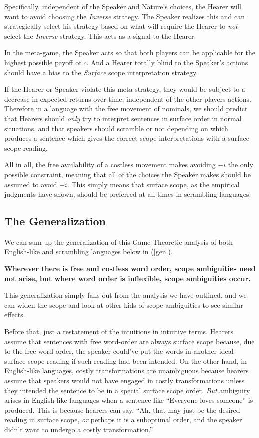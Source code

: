 \documentclass{article}
\begin{document}
Specifically, independent of the Speaker and Nature's choices, the Hearer will want to avoid choosing the \emph{Inverse} strategy.
The Speaker realizes this and can strategically select his strategy based on what will require the Hearer to \emph{not} select the \emph{Inverse} strategy.
This acts as a signal to the Hearer.

In the meta-game, the Speaker acts so that both players can be applicable for the highest possible payoff of $c$.
And a Hearer totally blind to the Speaker's actions should have a bias to the \emph{Surface} scope interpretation strategy.

If the Hearer or Speaker violate this meta-strategy, they would be subject to a decrease in expected returns over time, independent of the other players actions.
Therefore in a language with the free movement of nominals, we should predict that Hearers should \emph{only} try to interpret sentences in surface order in normal situations, and that speakers should scramble or not depending on which produces a sentence which gives the correct scope interpretations with a surface scope reading.

All in all, the free availability of a costless movement makes avoiding $-i$ the only possible constraint, meaning that all of the choices the Speaker makes should be assumed to avoid $-i$.
This simply means that surface scope, as the empirical judgments have shown, should be preferred at all times in scrambling languages.

\subsection{The Generalization}

We can sum up the generalization of this Game Theoretic analysis of both English-like and scrambling languages below in (\ref{gen}).

\begin{exe}
\ex \textbf{Wherever there is free and costless word order, scope ambiguities need not arise, but where word order is inflexible, scope ambiguities occur.
\label{gen}}
\end{exe}

This generalization simply falls out from the analysis we have outlined, and we can widen the scope and look at other kids of scope ambiguities to see similar effects.

Before that, just a restatement of the intuitions in intuitive terms. Hearers assume that sentences with free word-order are always surface scope because, due to the free word-order, the speaker could've put the words in another ideal surface scope reading if such reading had been intended. On the other hand, in English-like languages, costly transformations are unambiguous because hearers assume that speakers would not have engaged in costly transformations unless they intended the sentence to be in a special surface scope order. \emph{But} ambiguity arises in English-like languages when a sentence like ``Everyone loves someone'' is produced. This is because hearers can say, ``Ah, that may just be the desired reading in surface scope, \emph{or} perhaps it is a suboptimal order, and the speaker didn't want to undergo a costly transformation.''
\end{document}
